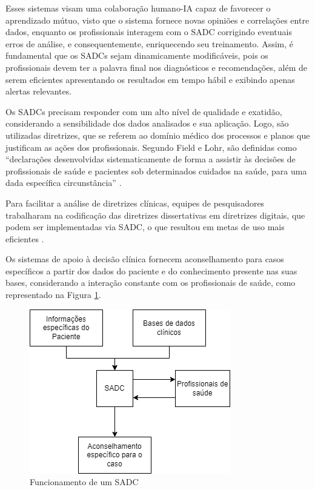 \documentclass[12pt]{article}
\begin{document}
Esses sistemas visam uma colaboração  humano-IA capaz de favorecer o aprendizado mútuo, visto que o sistema fornece novas opiniões e correlações entre dados, enquanto os profissionais interagem com o SADC corrigindo eventuais erros de análise, e consequentemente, enriquecendo seu treinamento. Assim, é fundamental que os SADCs sejam dinamicamente modificáveis, pois os profissionais devem ter a palavra final nos diagnósticos e recomendações, além de serem eficientes apresentando os resultados em tempo hábil e exibindo apenas alertas relevantes\cite{artigo_base}.

Os SADCs precisam responder com um alto nível de qualidade e exatidão, considerando a sensibilidade dos dados analisados e sua aplicação. Logo, são utilizadas diretrizes, que se referem ao domínio médico dos processos e planos que justificam as ações dos profissionais. Segundo Field e Lohr, são definidas como “declarações desenvolvidas sistematicamente de forma a assistir às decisões de profissionais de saúde e pacientes sob determinados cuidados na saúde, para uma dada específica circunstância” \cite{lichtenstein2011sistemas}.


Para facilitar a análise de diretrizes clínicas, equipes de pesquisadores trabalharam na codificação das diretrizes dissertativas em diretrizes digitais, que podem ser implementadas via SADC, o que resultou em metas de uso mais eficientes \cite{lichtenstein2011sistemas}. 


Os sistemas de apoio à decisão clínica fornecem aconselhamento para casos específicos a partir dos dados do paciente e do conhecimento presente nas suas bases, considerando a interação constante com os profissionais de saúde, como representado na Figura \ref{fig:esquema_SADC}.

\begin{figure}[ht]
\centering
\includegraphics[scale=0.6]{Imagens/SADC.png}
\caption{Funcionamento de um SADC}
\label{fig:esquema_SADC}
\end{figure}
\end{document}
